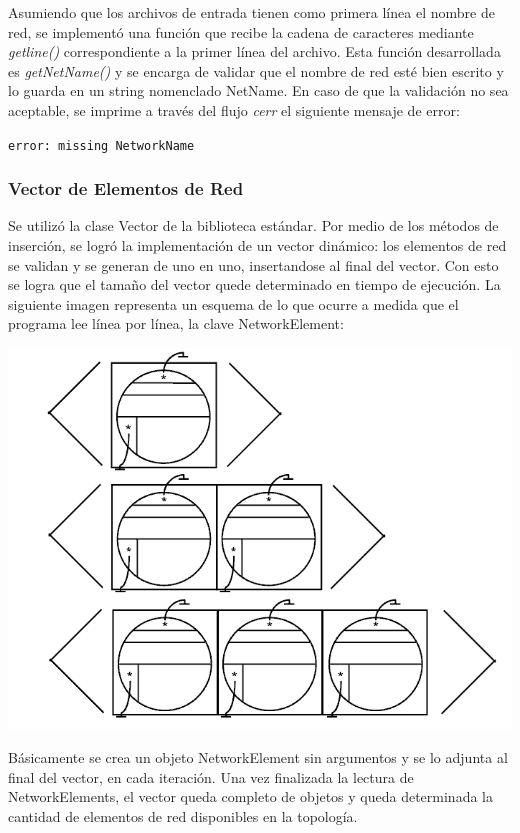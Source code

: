 \documentclass[10pt,a4paper]{article}
\begin{document}
Asumiendo que los archivos de entrada tienen como primera línea el nombre de red, se implementó una función que recibe la cadena de caracteres mediante \textit{getline()} correspondiente a la primer línea del archivo. Esta función desarrollada es \textit{getNetName()} y se encarga de validar que el nombre de red esté bien escrito y lo guarda en un string nomenclado NetName. En caso de que la validación no sea aceptable, se imprime a través del flujo \textit{cerr} el siguiente mensaje de error:\\
\begin{center}
\texttt{error: missing NetworkName}\\
\end{center}

\subsubsection{Vector de Elementos de Red}

Se utilizó la clase Vector de la biblioteca estándar. Por medio de los métodos de inserción, se logró la implementación de un vector dinámico: los elementos de red se validan y se generan de uno en uno, insertandose al final del vector. Con esto se logra que el tamaño del vector quede determinado en tiempo de ejecución. La siguiente imagen representa un esquema de lo que ocurre a medida que el programa lee línea por línea, la clave NetworkElement:\\
\begin{center}
\includegraphics[scale=0.15]{Images/vector_of_NetEls_growing.png}
\end{center}
Básicamente se crea un objeto NetworkElement sin argumentos y se lo adjunta al final del vector, en cada iteración. Una vez finalizada la lectura de NetworkElements, el vector queda completo de objetos y queda determinada la cantidad de elementos de red disponibles en la topología.
\end{document}

